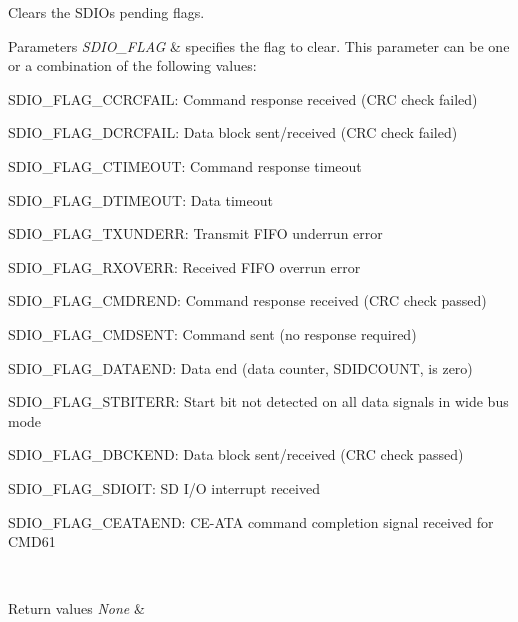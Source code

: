 Clears the S\+D\+IO\textquotesingle{}s pending flags. 


\begin{DoxyParams}{Parameters}
{\em S\+D\+I\+O\+\_\+\+F\+L\+AG} & specifies the flag to clear. This parameter can be one or a combination of the following values\+: \begin{DoxyItemize}
\item S\+D\+I\+O\+\_\+\+F\+L\+A\+G\+\_\+\+C\+C\+R\+C\+F\+A\+IL\+: Command response received (C\+RC check failed) \item S\+D\+I\+O\+\_\+\+F\+L\+A\+G\+\_\+\+D\+C\+R\+C\+F\+A\+IL\+: Data block sent/received (C\+RC check failed) \item S\+D\+I\+O\+\_\+\+F\+L\+A\+G\+\_\+\+C\+T\+I\+M\+E\+O\+UT\+: Command response timeout \item S\+D\+I\+O\+\_\+\+F\+L\+A\+G\+\_\+\+D\+T\+I\+M\+E\+O\+UT\+: Data timeout \item S\+D\+I\+O\+\_\+\+F\+L\+A\+G\+\_\+\+T\+X\+U\+N\+D\+E\+RR\+: Transmit F\+I\+FO underrun error \item S\+D\+I\+O\+\_\+\+F\+L\+A\+G\+\_\+\+R\+X\+O\+V\+E\+RR\+: Received F\+I\+FO overrun error \item S\+D\+I\+O\+\_\+\+F\+L\+A\+G\+\_\+\+C\+M\+D\+R\+E\+ND\+: Command response received (C\+RC check passed) \item S\+D\+I\+O\+\_\+\+F\+L\+A\+G\+\_\+\+C\+M\+D\+S\+E\+NT\+: Command sent (no response required) \item S\+D\+I\+O\+\_\+\+F\+L\+A\+G\+\_\+\+D\+A\+T\+A\+E\+ND\+: Data end (data counter, S\+D\+I\+D\+C\+O\+U\+NT, is zero) \item S\+D\+I\+O\+\_\+\+F\+L\+A\+G\+\_\+\+S\+T\+B\+I\+T\+E\+RR\+: Start bit not detected on all data signals in wide bus mode \item S\+D\+I\+O\+\_\+\+F\+L\+A\+G\+\_\+\+D\+B\+C\+K\+E\+ND\+: Data block sent/received (C\+RC check passed) \item S\+D\+I\+O\+\_\+\+F\+L\+A\+G\+\_\+\+S\+D\+I\+O\+IT\+: SD I/O interrupt received \item S\+D\+I\+O\+\_\+\+F\+L\+A\+G\+\_\+\+C\+E\+A\+T\+A\+E\+ND\+: C\+E-\/\+A\+TA command completion signal received for C\+M\+D61 \end{DoxyItemize}
\\
\hline
\end{DoxyParams}

\begin{DoxyRetVals}{Return values}
{\em None} & \\
\hline
\end{DoxyRetVals}


